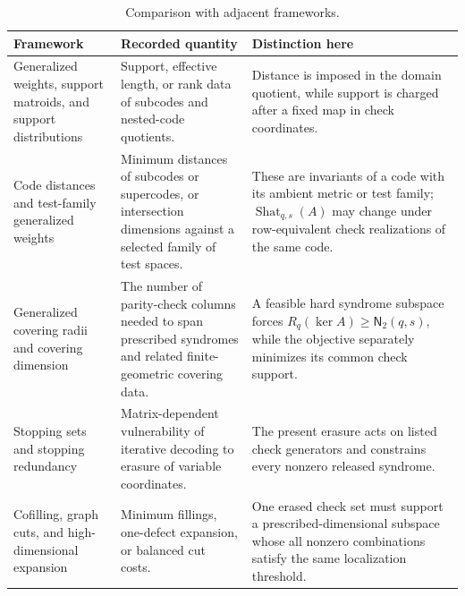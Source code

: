 \documentclass[11pt,letterpaper]{article}
\theoremstyle{plain}
\theoremstyle{definition}
\newcommand{\Shat}{\operatorname{Shat}}
\newcommand{\1}{\mathbf{1}}
\begin{document}
\begin{table}[tbp]
\centering
\caption{Comparison with adjacent frameworks.}
\label{tab:related-work}
\scriptsize
\renewcommand{\arraystretch}{1.08}
\begin{tabularx}{\textwidth}{@{}P{0.235\textwidth}YY@{}}
\toprule
\textbf{Framework} & \textbf{Recorded quantity} & \textbf{Distinction here}\\
\midrule
Generalized weights, support matroids, and support distributions
\cite{greene1976,klove1992,barg1997,britz2007,wei1991,forney1994,simonis1994,
kurihara2012,zhuang2014,luo2010,luoliu2023,wen2025}
& Support, effective length, or rank data of subcodes and nested-code
quotients.
& Distance is imposed in the domain quotient, while support is charged after
a fixed map in check coordinates.\\

Code distances and test-family generalized weights
\cite{campsmoreno2025,digiusto2025}
& Minimum distances of subcodes or supercodes, or intersection dimensions
against a selected family of test spaces.
& These are invariants of a code with its ambient metric or test family;
$\Shat_{q,s}(A)$ may change under row-equivalent check realizations of the
same code.\\

Generalized covering radii and covering dimension
\cite{elimelech2021,alfarano2026,britzrutherford2005,britzshiromoto2016}
& The number of parity-check columns needed to span prescribed syndromes and
related finite-geometric covering data.
& A feasible hard syndrome subspace forces
$R_q(\ker A)\ge\mathsf N_2(q,s)$, while the objective separately minimizes
its common check support.\\

Stopping sets and stopping redundancy \cite{schwartzvardy2006}
& Matrix-dependent vulnerability of iterative decoding to erasure of variable
coordinates.
& The present erasure acts on listed check generators and constrains every
nonzero released syndrome.\\

Cofilling, graph cuts, and high-dimensional expansion
\cite{gromov2010,dotterrer-kahle2012,matousekwagner2014,kaufmantessler2021,
oppenheimvalentiner2025,fiedler1973,gareyjohnsonstockmeyer1976}
& Minimum fillings, one-defect expansion, or balanced cut costs.
& One erased check set must support a prescribed-dimensional subspace whose
all nonzero combinations satisfy the same localization threshold.\\
\bottomrule
\end{tabularx}
\end{table}
\end{document}
